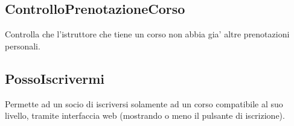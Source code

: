 \subsection{ControlloPrenotazioneCorso}



Controlla che l'istruttore che tiene un corso non abbia gia' altre prenotazioni personali.

\subsection{PossoIscrivermi}



Permette ad un socio di iscriversi solamente ad un corso compatibile al suo livello, tramite interfaccia web (mostrando o meno il pulsante di iscrizione).